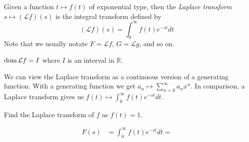 \documentclass[notes]{subfiles}
\begin{document}
\begin{definition}
    Given a function $t \mapsto f(t)$ of exponential type, then the \textit{Laplace transform} $s \mapsto (\mathcal{L}f)(s)$ is the integral transform defined by
    \[
        (\mathcal{L}f)(s) = \int_0^\infty f(t)e^{-st}dt
    \]
    Note that we usually notate $F = \mathcal{L}f$, $G = \mathcal{L}g$, and so on.
\end{definition}

\begin{theorem}
    $\operatorname{dom} \mathcal{L}f = I$ where $I$ is an interval in $\mathbb{R}$.
\end{theorem}

We can view the Laplace transform as a continuous version of a generating function. With a generating function we get $a_n \mapsto \sum_{n = 0}^\infty a_n x^n$. In comparison, a Laplace transform gives us $f(t) \mapsto \int_0^\infty f(t)e^{-st}dt$.

\begin{exercise} \label{laplace_transform_base_case}
    Find the Laplace transform of $f$ as $f(t) = 1$.
\end{exercise}
\begin{solution}
    \begin{align*}
        F(s)
        &= \int_0^\infty f(t)e^{-st}dt
        = 
    \end{align*}
\end{solution}
\end{document}
